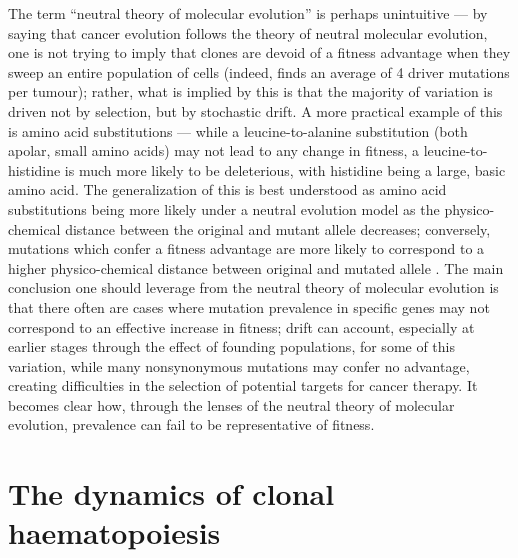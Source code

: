 The term “neutral theory of molecular evolution” is perhaps unintuitive --- by saying that cancer evolution follows the theory of neutral molecular evolution, one is not trying to imply that clones are devoid of a fitness advantage when they sweep an entire population of cells (indeed,  finds an average of 4 driver mutations per tumour); rather, what is implied by this is that the majority of variation is driven not by selection, but by stochastic drift. A more practical example of this is amino acid substitutions --- while a leucine-to-alanine substitution (both apolar, small amino acids) may not lead to any change in fitness, a leucine-to-histidine is much more likely to be deleterious, with histidine being a large, basic amino acid. The generalization of this is best understood as amino acid substitutions being more likely under a neutral evolution model as the physico-chemical distance between the original and mutant allele decreases; conversely, mutations which confer a fitness advantage are more likely to correspond to a higher physico-chemical distance between original and mutated allele \cite{Kimura1979-ps}. The main conclusion one should leverage from the neutral theory of molecular evolution is that there often are cases where mutation prevalence in specific genes may not correspond to an effective increase in fitness; drift can account, especially at earlier stages through the effect of founding populations, for some of this variation, while many nonsynonymous mutations may confer no advantage, creating difficulties in the selection of potential targets for cancer therapy. It becomes clear how, through the lenses of the neutral theory of molecular evolution, prevalence can fail to be representative of fitness. 

\section{The dynamics of clonal haematopoiesis}

